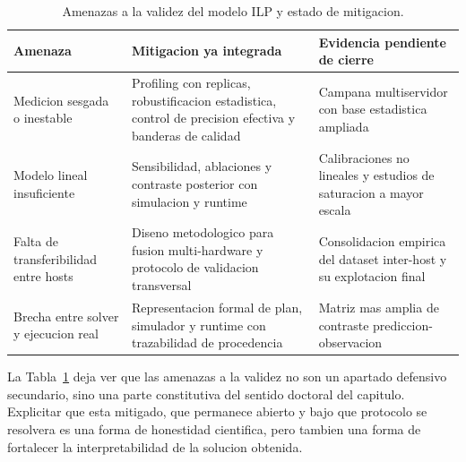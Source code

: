 \begin{table}[t]
\centering
\caption{Amenazas a la validez del modelo ILP y estado de mitigacion.}
\label{tab:ilp-validity-threats}
\scriptsize
\setlength{\tabcolsep}{4pt}
\begin{tabularx}{\textwidth}{lXX}
\toprule
Amenaza & Mitigacion ya integrada & Evidencia pendiente de cierre \\
\midrule
Medicion sesgada o inestable & Profiling con replicas, robustificacion estadistica, control de precision efectiva y banderas de calidad & Campana multiservidor con base estadistica ampliada \\
Modelo lineal insuficiente & Sensibilidad, ablaciones y contraste posterior con simulacion y runtime & Calibraciones no lineales y estudios de saturacion a mayor escala \\
Falta de transferibilidad entre hosts & Diseno metodologico para fusion multi-hardware y protocolo de validacion transversal & Consolidacion empirica del dataset inter-host y su explotacion final \\
Brecha entre solver y ejecucion real & Representacion formal de plan, simulador y runtime con trazabilidad de procedencia & Matriz mas amplia de contraste prediccion-observacion \\
\bottomrule
\end{tabularx}
\normalsize
\end{table}

La Tabla~\ref{tab:ilp-validity-threats} deja ver que las amenazas a la validez no son un apartado defensivo secundario, sino una parte constitutiva del sentido doctoral del capitulo. Explicitar que esta mitigado, que permanece abierto y bajo que protocolo se resolvera es una forma de honestidad cientifica, pero tambien una forma de fortalecer la interpretabilidad de la solucion obtenida.
